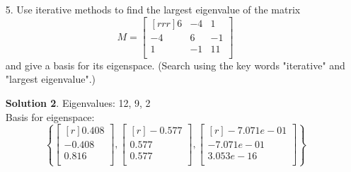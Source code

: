 \documentclass[12pt]{article}
\theoremstyle{definition}
\newtheorem*{solution}{Solution} %
\theoremstyle{plain}
\begin{document}
\begin{enumerate}
\begin{solution}
\begin{align*}
	&+
	\begin{bmatrix}[rrrrr]
	274&274&274&274&274\\
	0&548&274&274&274\\
	0&0&822&274&274\\
	0&0&0&1096&274\\
	0&0&0&0&1370\\\end{bmatrix}\\
	&+
	\begin{bmatrix}[rrrrr]
	-120&0&0&0&0\\
	0&-120&0&0&0\\
	0&0&-120&0&0\\
	0&0&0&-120&0\\
	0&0&0&0&-120\\\end{bmatrix}
\end{align*}

\end{solution}


\item[5.] Use iterative methods to find the largest eigenvalue of the matrix
\[ M = \begin{bmatrix}[rrr]6&-4&1\\-4&6&-1\\1&-1&11\\\end{bmatrix} \]
and give a basis for its eigenspace. (Search using the key words "iterative" and "largest eigenvalue".)
\begin{solution}
Eigenvalues: 12, 9, 2\\
Basis for eigenspace:  
\[ \left\{\begin{bmatrix}[r]0.408\\-0.408\\0.816\\\end{bmatrix},\begin{bmatrix}[r]-0.577\\0.577\\0.577\\\end{bmatrix},\begin{bmatrix}[r]-7.071e-01\\-7.071e-01\\3.053e-16\\\end{bmatrix}\right\} \]
\end{solution}
\end{enumerate}
\end{document}
